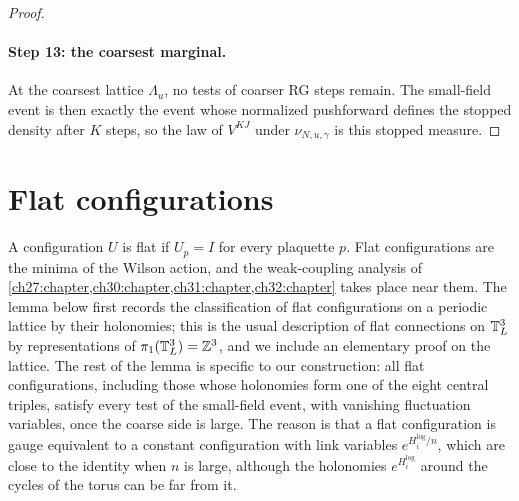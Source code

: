 \begin{proof}
\paragraph{Step 13: the coarsest marginal.}
At the coarsest lattice $\Lambda_u$, no tests of coarser RG steps remain. The small-field event is then exactly the event whose normalized pushforward defines the stopped density after $K$ steps, so the law of $V^{KJ}$ under $\nu_{N,u,\gamma}$ is this stopped measure.
\end{proof}

\section{Flat configurations}\label{ch11:sec:flat}

A configuration $U$ is flat if $U_p=I$ for every plaquette $p$. Flat configurations are the minima of the Wilson action, and the weak-coupling analysis of \cref{ch27:chapter,ch30:chapter,ch31:chapter,ch32:chapter} takes place near them. The lemma below first records the classification of flat configurations on a periodic lattice by their holonomies; this is the usual description of flat connections on $\mathbb T_L^3$ by representations of $\pi_1(\mathbb T_L^3)=\mathbb Z^3$, and we include an elementary proof on the lattice. The rest of the lemma is specific to our construction: all flat configurations, including those whose holonomies form one of the eight central triples, satisfy every test of the small-field event, with vanishing fluctuation variables, once the coarse side is large. The reason is that a flat configuration is gauge equivalent to a constant configuration with link variables $e^{H^{\log}_i/n}$, which are close to the identity when $n$ is large, although the holonomies $e^{H^{\log}_i}$ around the cycles of the torus can be far from it.

